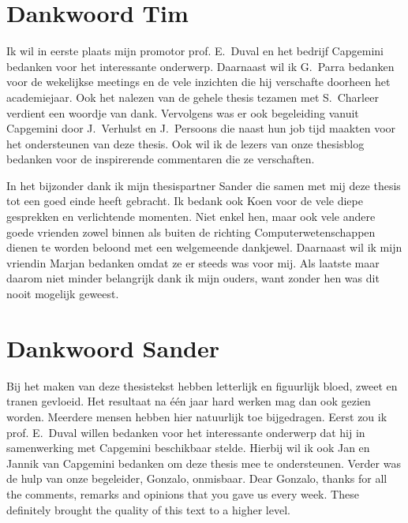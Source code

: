 \documentclass[master=cws,dutch,masteroption={vs,gs},inputenc=utf8]{kulemt}
\begin{document}

\chapter*{Dankwoord Tim}
Ik wil in eerste plaats mijn promotor prof. E.~Duval en het bedrijf Capgemini bedanken voor het interessante onderwerp.
Daarnaast wil ik G.~Parra bedanken voor de wekelijkse meetings en de vele inzichten die hij verschafte doorheen het academiejaar.
Ook het nalezen van de gehele thesis tezamen met S.~Charleer verdient een woordje van dank.
Vervolgens was er ook begeleiding vanuit Capgemini door J.~Verhulst en J.~Persoons die naast hun job tijd maakten voor het ondersteunen van deze thesis.
Ook wil ik de lezers van onze thesisblog bedanken voor de inspirerende commentaren die ze verschaften.

In het bijzonder dank ik mijn thesispartner Sander die samen met mij deze thesis tot een goed einde heeft gebracht.
Ik bedank ook Koen voor de vele diepe gesprekken en verlichtende momenten. 
Niet enkel hen, maar ook vele andere goede vrienden zowel binnen als buiten de richting Computerwetenschappen dienen te worden beloond met een welgemeende dankjewel.
Daarnaast wil ik mijn vriendin Marjan bedanken omdat ze er steeds was voor mij.
Als laatste maar daarom niet minder belangrijk dank ik mijn ouders, want zonder hen was dit nooit mogelijk geweest.

\chapter*{Dankwoord Sander}
Bij het maken van deze thesistekst hebben letterlijk en figuurlijk bloed, zweet en tranen gevloeid.
Het resultaat na één jaar hard werken mag dan ook gezien worden.
Meerdere mensen hebben hier natuurlijk toe bijgedragen.
Eerst zou ik prof. E.~Duval willen bedanken voor het interessante onderwerp dat hij in samenwerking met Capgemini beschikbaar stelde.
Hierbij wil ik ook Jan en Jannik van Capgemini bedanken om deze thesis mee te ondersteunen.
Verder was de hulp van onze begeleider,  Gonzalo,  onmisbaar.
Dear Gonzalo,  thanks for all the comments,  remarks and opinions that you gave us every week.
These definitely brought the quality of this text to a higher level.
\end{document}
